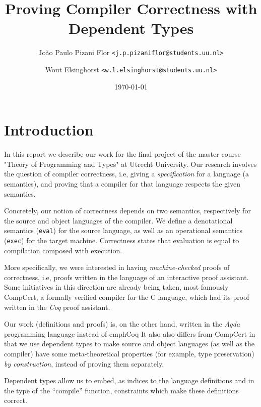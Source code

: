 \documentclass[a4paper]{article}
\title{Proving Compiler Correctness with Dependent Types}
\date{\today}
\author {
    João Paulo Pizani Flor \texttt{<j.p.pizaniflor@students.uu.nl>} \\
    \and Wout Elsinghorst \texttt{<w.l.elsinghorst@students.uu.nl>} \\
}
\begin{document}
    \maketitle

    \section{Introduction}
    \label{sec:intro}
        In this report we describe our work for the final project of the master course
        "Theory of Programming and Types" at Utrecht University. Our research involves
        the question of compiler correctness, i.e, giving a \emph{specification} for
        a language (a semantics), and proving that a compiler for that language respects
        the given semantics.

        Concretely, our notion of correctness depends on two semantics, respectively for the source
        and object languages of the compiler. We define a denotational semantics (\texttt{eval}) for the source
        language, as well as an operational semantics (\texttt{exec}) for the target machine. Correctness
        states that evaluation is equal to compilation composed with execution.

        More specifically, we were interested in having \emph{machine-checked} proofs of correctness,
        i.e, proofs written in the language of an interactive proof assistant. Some initiatives in
        this direction are already being taken, most famously CompCert, a formally verified compiler
        for the C language, which had its proof written in the \emph{Coq} proof assistant.

        Our work (definitions and proofs) is, on the other hand, written in the
        \emph{Agda} programming language instead of emph{Coq} It also also differs from CompCert
        in that we use dependent types to make source and object languages (as well as the compiler)
        have some meta-theoretical properties (for example, type preservation) \emph{by construction},
        instead of proving them separately.

        Dependent types allow us to embed, as indices to the language definitions and in the type
        of the ``compile'' function, constraints which make these definitions correct.
\end{document}
